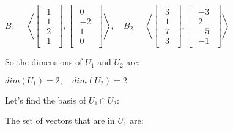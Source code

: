 \begin{math}
    B_1 = \left<\begin{bmatrix}
        \begin{array}{c}
            1 \\
            1 \\
            2 \\
            1
        \end{array}
    \end{bmatrix},
    \begin{bmatrix}
        \begin{array}{c}
            0  \\
            -2 \\
            1  \\
            0
        \end{array}
    \end{bmatrix}\right>,
    \quad
    B_2 = \left<\begin{bmatrix}
        \begin{array}{c}
            3 \\
            1 \\
            7 \\
            3
        \end{array}
    \end{bmatrix},
    \begin{bmatrix}
        \begin{array}{c}
            -3 \\
            2  \\
            -5 \\
            -1
        \end{array}
    \end{bmatrix}\right>
\end{math}

\singlespacing
\singlespacing

So the dimensions of $U_1$ and $U_2$ are:

\singlespacing

\begin{math}
    dim(U_1) = 2,\quad dim(U_2) = 2
\end{math}

\singlespacing
\singlespacing
\singlespacing

Let's find the basis of $U_1 \cap U_2$:

\singlespacing

The set of vectors that are in $U_1$ are:

